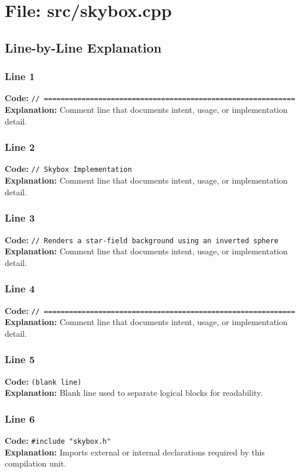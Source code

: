 \documentclass[11pt,a4paper]{article}
\begin{document}
\newpage
\section{File: src/skybox.cpp}
\subsection{Line-by-Line Explanation}
\subsubsection*{Line 1}
\textbf{Code:} \verb|// ============================================================|\\
\textbf{Explanation:} Comment line that documents intent, usage, or implementation detail.

\subsubsection*{Line 2}
\textbf{Code:} \verb|// Skybox Implementation|\\
\textbf{Explanation:} Comment line that documents intent, usage, or implementation detail.

\subsubsection*{Line 3}
\textbf{Code:} \verb|// Renders a star-field background using an inverted sphere|\\
\textbf{Explanation:} Comment line that documents intent, usage, or implementation detail.

\subsubsection*{Line 4}
\textbf{Code:} \verb|// ============================================================|\\
\textbf{Explanation:} Comment line that documents intent, usage, or implementation detail.

\subsubsection*{Line 5}
\textbf{Code:} \texttt{(blank line)}\\
\textbf{Explanation:} Blank line used to separate logical blocks for readability.

\subsubsection*{Line 6}
\textbf{Code:} \verb|#include "skybox.h"|\\
\textbf{Explanation:} Imports external or internal declarations required by this compilation unit.
\end{document}
